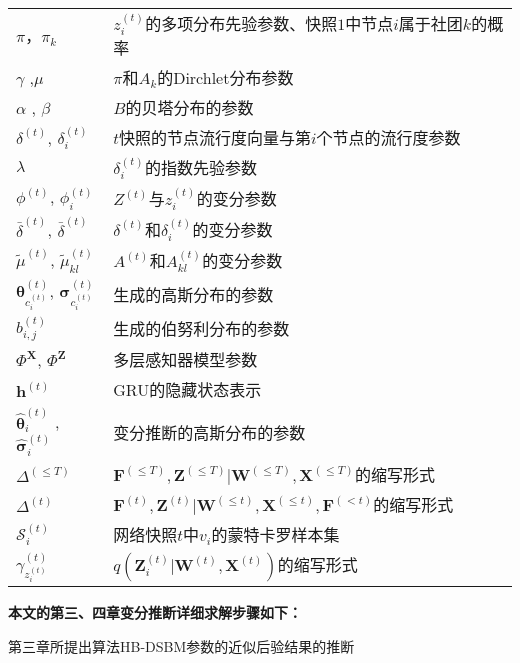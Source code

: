 \begin{center}
\begin{longtable}{@{}lp{300pt}@{}}
			$\pi$，$\pi_k$ & $z^{(t)}_i$的多项分布先验参数、快照$1$中节点$i$属于社团$k$的概率\\
			${\gamma}$ ,${\mu}$ & ${\pi}$和${A}_k$的Dirchlet分布参数 \\
			${\alpha}$ , ${\beta}$ & $B$的贝塔分布的参数 \\   
			$\delta^{(t)}$, $\delta_i^{(t)}$ & $t$快照的节点流行度向量与第$i$个节点的流行度参数 \\
			$\lambda$ & $\delta_i^{(t)}$的指数先验参数 \\
			$\phi^{(t)}$, $\phi^{(t)}_i$ &$Z^{(t)}$与$z^{(t)}_i$的变分参数 \\
			$\bar{\delta}^{(t)}$, $\bar{\delta}^{(t)}$ &$\delta^{(t)}$和$\delta^{(t)}_i$的变分参数 \\
			$\tilde{\mu}^{(t)}$, $\tilde{\mu}^{(t)}_{kl}$ &$A^{(t)}$和$A^{(t)}_{kl}$的变分参数 \\
			$\bm{\theta}_{c_i^{(t)}}^{(t)}$, $\bm{\sigma}_{c_i^{(t)}}^{(t)}$ & 生成的高斯分布的参数\\
			$b_{i,j}^{(t)}$ &  生成的伯努利分布的参数 \\
			$\Phi^{\mathbf{X}}$, $\Phi^{\mathbf{Z}}$& 多层感知器模型参数\\
			$\mathbf{h}^{(t)}$ & GRU的隐藏状态表示 \\
			$\hat{\bm{\theta}}^{(t)}_i$ , $\hat{\bm{\sigma}}^{(t)}_i$ & 变分推断的高斯分布的参数 \\
			$\Delta^{(\leq T)}$ & $\mathbf{F}^{(\leq T)}, \mathbf{Z}^{(\leq T)}|\mathbf{W}^{(\leq T)},\mathbf{X}^{(\leq T)}$的缩写形式 \\
			$\Delta^{(t)}$ & $\mathbf{F}^{(t)}, \mathbf{Z}^{(t)}|\mathbf{W}^{(\leq t)},\mathbf{X}^{(\leq t)},\mathbf{F}^{(< t)}$的缩写形式\\
			$\mathcal{S}_i^{(t)}$ & 网络快照$t$中$v_i$的蒙特卡罗样本集 \\
			$\gamma_{z_i^{(t)}}^{(t)}$ & $q(\mathbf{Z}_i^{(t)}|\mathbf{W}^{(t)},\mathbf{X}^{(t)})$的缩写形式 \\
			\hline
	\end{longtable}
\end{center}

\noindent\textbf{本文的第三、四章变分推断详细求解步骤如下：}
\begin{proposition}
	第三章所提出算法HB-DSBM参数的近似后验结果的推断
	\label{HB-DSBM:inference}
\end{proposition}


